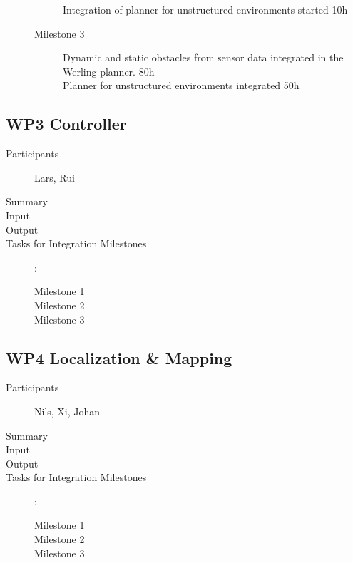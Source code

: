 \documentclass[11pt,a4paper]{article}
\begin{document}
\begin{description}
\begin{description}
                  Integration of planner for
                  unstructured environments started 10h                  
		\item[Milestone 3] Dynamic and static obstacles from
                  sensor data integrated in the Werling planner. 80h \\
                  
                  Planner for unstructured environments integrated 50h
	\end{description}	 
\end{description}

\subsection{WP3 Controller}

\begin{description}
\item[Participants] Lars, Rui
\item[Summary]
\item[Input]
\item[Output]
\item[Tasks for Integration Milestones]:\
	\begin{description}
		\item[Milestone 1]
		\item[Milestone 2]
		\item[Milestone 3] 
	\end{description}	 
\end{description}

\subsection{WP4 Localization \& Mapping}

\begin{description}
\item[Participants] Nils, Xi, Johan
\item[Summary]
\item[Input]
\item[Output]
\item[Tasks for Integration Milestones]:\
	\begin{description}
		\item[Milestone 1]
		\item[Milestone 2]
		\item[Milestone 3] 
	\end{description}	 
\end{description}
\end{document}
